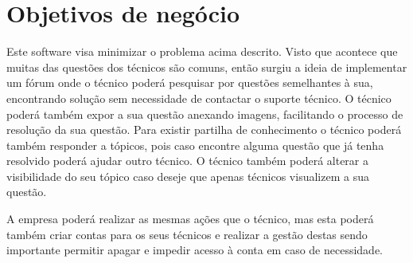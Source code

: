 \section{Objetivos de negócio}

Este software visa minimizar o problema acima descrito. Visto que acontece que muitas das 
questões dos técnicos são comuns, então surgiu a ideia de implementar um fórum onde o técnico poderá 
pesquisar por questões semelhantes à sua, encontrando solução sem necessidade de contactar o suporte 
técnico. O técnico poderá também expor a sua questão anexando imagens, facilitando o processo de 
resolução da sua questão. Para existir partilha de conhecimento o técnico poderá também responder 
a tópicos, pois caso encontre alguma questão que já tenha resolvido poderá ajudar outro técnico. O técnico 
também poderá alterar a visibilidade do seu tópico caso deseje que apenas técnicos visualizem a sua questão.

A empresa poderá realizar as mesmas ações que o técnico, mas esta poderá também criar contas para os seus 
técnicos e realizar a gestão destas sendo importante permitir apagar e impedir acesso à conta em caso de 
necessidade.
